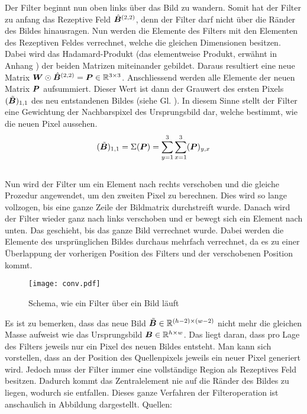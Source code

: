 \para{}
Der Filter beginnt nun oben links über das Bild zu wandern. Somit
hat der Filter zu anfang das Rezeptive Feld $\hat{\bm{B}}^{(2,2)}$, denn der
Filter darf nicht über die Ränder des Bildes hinausragen.
Nun werden die Elemente des Filters mit den Elementen des Rezeptiven Feldes
verrechnet, welche die gleichen Dimensionen besitzen. Dabei wird das
Hadamard-Produkt (das elementweise Produkt, erwähnt in Anhang ) der beiden Matrizen miteinander
gebildet. Daraus resultiert eine neue Matrix $\bm{W} \odot
\hat{\bm{B}}^{(2,2)} = \bm{P} \in \mathbb{R}^{3 \times 3}$.
Anschliessend werden alle Elemente der neuen Matrix $\bm{P}$
aufsummiert. Dieser Wert ist dann der Grauwert des ersten Pixels
$(\tilde{\bm{B}})_{1,1}$ des neu entstandenen
Bildes (siehe Gl. ). In diesem Sinne stellt der Filter eine
Gewichtung der Nachbarspixel des Ursprungsbild dar, welche
bestimmt, wie die neuen Pixel aussehen.
\\
\begin{equation}\label{eq:filter1}
  (\tilde{\bm{B}})_{1,1} = \Sigma(\bm{P}) = \sum_{y=1}^3 \sum_{x=1}^3 (\bm{P})_{y,x}
\end{equation}
\\
Nun wird der Filter um ein Element nach rechts verschoben und die gleiche
Prozedur angewendet, um den zweiten Pixel zu berechnen. Dies
wird so lange vollzogen, bis eine ganze Zeile der Bildmatrix durchstreift wurde.
Danach wird der Filter wieder ganz nach links verschoben und er bewegt sich ein
Element nach unten. Das geschieht, bis das ganze Bild verrechnet wurde.
Dabei werden die Elemente des ursprünglichen Bildes durchaus mehrfach
verrechnet, da es zu einer Überlappung der vorherigen Position des Filters und
der verschobenen Position kommt.
\para{}
\begin{figure}[h!]
  \centering
  \texttt{[image: conv.pdf]}
  \caption{Schema, wie ein Filter über ein Bild läuft}
  \label{fig:filteroperation}
\end{figure}
\para{}
Es ist zu bemerken, dass das neue Bild $\tilde{\bm{B}} \in \mathbb{R}^{(h-2) \times (w-2)}$ nicht mehr die gleichen Masse
aufweist wie das Ursprungsbild $\bm{B} \in \mathbb{R}^{h \times w}$. Das liegt daran, dass pro
Lage des Filters jeweils nur ein Pixel des neuen Bildes entsteht. Man kann
sich vorstellen, dass an der Position des Quellenpixels jeweils ein neuer
Pixel generiert wird. Jedoch muss der Filter immer eine vollständige Region als
Rezeptives Feld besitzen. Dadurch kommt das Zentralelement nie auf die Ränder des
Bildes zu liegen, wodurch sie entfallen.
\para{}
Dieses ganze Verfahren der Filteroperation ist anschaulich in Abbildung
 dargestellt.
\para{}
Quellen: \cite{deeplearning.ai:cnn} \cite{wiki:convolution}

